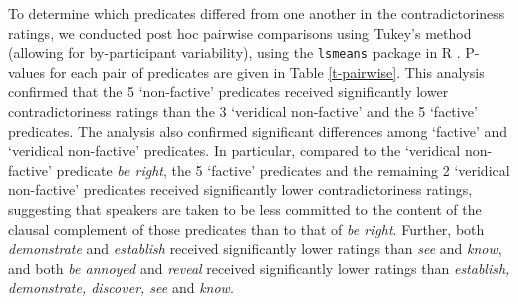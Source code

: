 \documentclass[11pt,fleqn]{article}
\newcommand{\6}{\mbox{$[\hspace*{-.6mm}[$}}
\newcommand{\9}{\mbox{$]\hspace*{-.6mm}]$}}
\begin{document}
{To determine which predicates differed from one another in the contradictoriness ratings, we conducted post hoc pairwise comparisons using Tukey's method (allowing for by-participant variability), using the \verb|lsmeans| package \citep{tukey} in R \citep{r}. P-values for each pair of predicates are given in Table \ref{t-pairwise}. This analysis confirmed that the 5 `non-factive' predicates received significantly lower contradictoriness ratings than the 3 `veridical non-factive' and the 5 `factive' predicates. The analysis also confirmed significant differences among `factive' and `veridical non-factive' predicates. In particular, compared to the `veridical non-factive' predicate {\em be right}, the 5 `factive' predicates and the remaining 2 `veridical non-factive' predicates received significantly lower contradictoriness ratings, suggesting that speakers are taken to be less committed to the content of the clausal complement of those predicates than to that of {\em be right}. Further, both {\em demonstrate} and {\em establish} received significantly lower ratings than {\em see} and {\em know}, and both {\em be annoyed} and {\em reveal} received significantly lower ratings than {\em establish, demonstrate, discover, see} and {\em know}. 

\begin{table}[H]
\setlength\tabcolsep{3pt}

\centering
\small

\begin{tabular}{l l l l l l l l l l l l l l l l l l l l }
\toprule


\end{tabular}
\end{table}}
\end{document}
